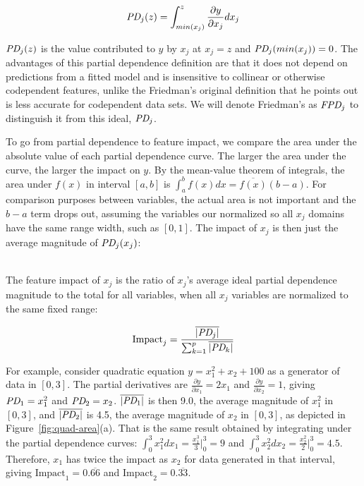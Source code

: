 \documentclass[11pt]{article}
\newcommand{\figref}[1]{Figure~\ref{#1}}
\newcommand{\Imp}{\text{Impact}}
\begin{document}
\begin{equation}\label{eq:pd}
\text{\it PD}_j(z) = \int_{min(x_j)}^z \frac{\partial y}{\partial x_j} dx_j
\end{equation}

$\text{\it PD}_j(z)$ is the value contributed to $y$ by $x_j$ at $x_j = z$ and $\text{\it PD}_j(min(x_j))=0$. The advantages of this partial dependence definition are that it does not depend on predictions from a fitted model and is insensitive to collinear or otherwise codependent features, unlike the Friedman's original definition that he points out is less accurate for codependent data sets. We will denote Friedman's as $\text{\it FPD}_j$ to distinguish it from this ideal, $\text{\it PD}_j$.

To go from partial dependence to feature impact, we compare the area under the absolute value of each partial dependence curve. The larger the area under the curve, the larger the impact on $y$.   By the mean-value theorem of integrals, the area under $f(x)$ in interval $[a,b]$ is $\int_{a}^{b} f(x) dx = \overline{f(x)}(b-a)$.  For comparison purposes between variables, the actual area is not important and the $b-a$ term drops out, assuming the variables our normalized so all $x_j$ domains have the same range width, such as $[0,1]$. The impact of $x_j$ is then just the average magnitude of $\text{\it PD}_j(x_j)$:

~\\
 The feature impact of $x_j$ is the ratio of $x_j$'s average ideal partial dependence magnitude to the total for all variables, when all $x_j$ variables are normalized to the same fixed range:

\begin{equation}\label{eq:Epd2a}
\Imp_j = \frac{\overline{|\text{\it PD}_j|}}{\sum_{k=1}^p \overline{|\text{\it PD}_k|}}
\end{equation}

\noindent For example, consider quadratic equation $y = x_1^2 + x_2 + 100$ as a generator of data in $[0,3]$. The partial derivatives are $\frac{\partial y}{\partial x_1} = 2 x_1$ and $\frac{\partial y}{\partial x_2} = 1$, giving $\text{\it PD}_1 = x_1^2$ and $\text{\it PD}_2 = x_2$. $\overline{|\text{\it PD}_1|}$ is then 9.0, the average magnitude of $x_1^2$ in $[0,3]$, and $\overline{|\text{\it PD}_2|}$ is 4.5, the average magnitude of $x_2$ in $[0,3]$, as depicted in \figref{fig:quad-area}(a). That is the same result obtained by integrating under the partial dependence curves:  $\int_0^3 x_1^2 dx_1 = \frac{x_1^3}{3} \big |_0^3 = 9$ and $\int_0^3 x_2^2 dx_2 = \frac{x_2^2}{2} \big |_0^3 = 4.5$.   Therefore, $x_1$ has twice the impact as $x_2$ for data generated in that interval, giving $\Imp_1 = 0.\overline{66}$ and $\Imp_2 = 0.\overline{33}$.
\end{document}
